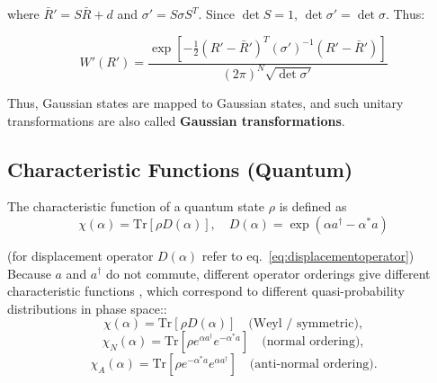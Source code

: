 where $\bar{R}' = S\bar{R} + d$ and $\sigma' = S \sigma S^T$. Since $\det S = 1$, $\det \sigma' = \det \sigma$. Thus:

\begin{equation}
    W'(R') = \frac{\exp\left[-\frac{1}{2}(R'-\bar{R}')^T (\sigma')^{-1} (R'-\bar{R}')\right]}{(2\pi)^N \sqrt{\det \sigma'}}
\end{equation}

Thus, Gaussian states are mapped to Gaussian states, and such unitary transformations are also called \textbf{Gaussian transformations}.







\vspace{0.5em}






\subsection{Characteristic Functions (Quantum)}

The characteristic function of a quantum state $\rho$ is defined as
\begin{equation}
\chi(\alpha) = \mathrm{Tr}\left[\rho D(\alpha)\right], \quad
D(\alpha) = \exp(\alpha a^\dagger - \alpha^* a)
\end{equation}

(for displacement operator $D(\alpha)$ refer to eq.~\eqref{eq:displacementoperator})
Because $a$ and $a^\dagger$ do not commute, different operator orderings give different characteristic functions \cite{braunstein2005cv}, which correspond to different quasi-probability distributions in phase space::
\begin{equation}
\chi(\alpha) = \mathrm{Tr}[\rho D(\alpha)] \quad \text{(Weyl / symmetric)},
\end{equation}
\begin{equation}
\chi_N(\alpha) = \mathrm{Tr}\left[\rho e^{\alpha a^\dagger} e^{-\alpha^* a}\right] \quad \text{(normal ordering)},
\end{equation}
\begin{equation}
\chi_A(\alpha) = \mathrm{Tr}\left[\rho  e^{-\alpha^* a} e^{\alpha a^\dagger}\right] \quad \text{(anti-normal ordering)}.
\end{equation}



